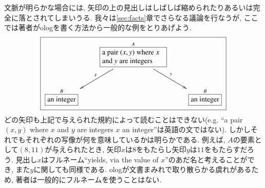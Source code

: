 
文脈が明らかな場合には, 矢印の上の見出しはしばしば縮められたりあるいは完全に落とされてしまいうる. 我々は\ref{sec:facts}章でさらなる議論を行なうが, ここでは著者がologを書く方法から一般的な例をとりあげよう. \begin{align}\label{dia:pair of integers}\fbox{\xymatrixnocompile{&\obox{A}{1.2in}{\rr a pair $(x,y)$ where $x$ and $y$ are integers}\ar[dl]_x\ar[dr]^y\\\smbox{B}{an integer}&&\smbox{B}{an integer}}}\end{align} どの矢印も上記で与えられた規約によって読むことはできない(e.g. ``a pair $(x,y)$ where $x$ and $y$ are integers $x$ an integer''は英語の文ではない). しかしそれでもそれぞれの写像が何を意味しているかは明らかである. 例えば, $A$の要素として$(8,11)$が与えられたとき, 矢印$x$は$8$をもたらし矢印$y$は$11$をもたらすだろう. 見出し$x$はフルネーム``yields, via the value of $x$''のあだ名と考えることができ, また$y$に関しても同様である. ologが文書まみれで取り散らかる虞れがあるため, 著者は一般的にフルネームを使うことはない.


